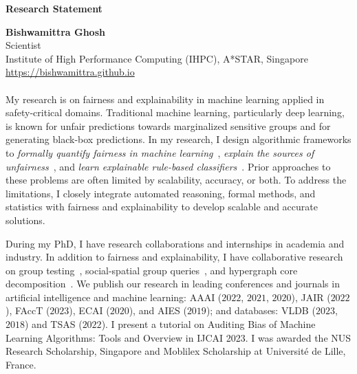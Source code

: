 \documentclass[10pt]{article}
\newcommand{\blue}[1]{\textcolor{blue}{#1}}
\begin{document}
	\begin{center}
		\large\textbf{Research Statement} 
	\end{center}
	\textbf{Bishwamittra Ghosh}\\		
	\noindent Scientist\\
	Institute of High Performance Computing (IHPC), A*STAR, Singapore\\
	\blue{\url{https://bishwamittra.github.io}}



	\paragraph{}
	My research is on fairness and explainability in machine learning applied in safety-critical domains. Traditional machine learning, particularly deep learning, is known for  unfair predictions towards marginalized sensitive groups and for generating black-box predictions. In my research, I design algorithmic frameworks to \textit{formally quantify fairness in machine learning}~\cite{ghosh2021justicia, ghosh2022algorithmic}, \textit{explain the sources of unfairness}~\cite{ghosh2022how}, and \textit{learn explainable rule-based classifiers}~\cite{ghosh22efficient, ghosh2019incremental, ghosh2020classification}. Prior approaches to these problems are often limited by scalability, accuracy, or both. To address the limitations, I closely integrate automated reasoning, formal methods, and statistics with fairness and explainability to develop scalable and accurate solutions.
	
	

	
	
	During my PhD, I have  research collaborations and internships in academia and industry. In addition to fairness and explainability, I have collaborative research on  group testing~\cite{ciampiconi2020maxsat}, social-spatial group queries~\cite{ghosh2018flexible, apon2021social}, and hypergraph core decomposition~\cite{arafat2023neighborhood}. We publish our research in leading conferences and journals in artificial intelligence and machine learning: AAAI ($2022$, $2021$, $2020$), JAIR ($2022$), FAccT ($2023$), ECAI ($2020$), and AIES ($2019$); and databases: VLDB ($2023$, $2018$) and TSAS ($2022$). I present a tutorial on Auditing Bias of Machine Learning Algorithms: Tools and Overview in IJCAI 2023. I was awarded the NUS Research Scholarship, Singapore and Moblilex Scholarship at Universit\'e de Lille, France.
	
	
	
\end{document}
